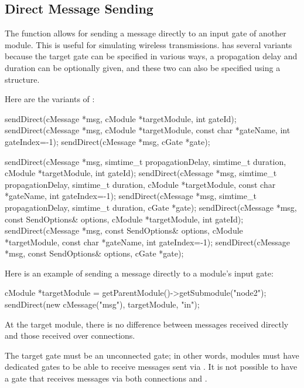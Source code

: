 \subsection{Direct Message Sending}
\label{sec:simple-modules:direct-sending}

The  function allows for sending a message directly to an
input gate of another module. This is useful for simulating wireless
transmissions.  has several variants because the target gate
can be specified in various ways, a propagation delay and duration can be
optionally given, and these two can also be specified using a
 structure.

Here are the variants of :

\begin{cpp}
sendDirect(cMessage *msg, cModule *targetModule, int gateId);
sendDirect(cMessage *msg, cModule *targetModule, const char *gateName,
               int gateIndex=-1);
sendDirect(cMessage *msg, cGate *gate);

sendDirect(cMessage *msg, simtime_t propagationDelay, simtime_t duration,
               cModule *targetModule, int gateId);
sendDirect(cMessage *msg, simtime_t propagationDelay, simtime_t duration,
               cModule *targetModule, const char *gateName, int gateIndex=-1);
sendDirect(cMessage *msg, simtime_t propagationDelay, simtime_t duration,
               cGate *gate);
sendDirect(cMessage *msg, const SendOptions& options, cModule *targetModule,
               int gateId);
sendDirect(cMessage *msg, const SendOptions& options, cModule *targetModule,
               const char *gateName, int gateIndex=-1);
sendDirect(cMessage *msg, const SendOptions& options, cGate *gate);
\end{cpp}

Here is an example of sending a message directly to a module's input gate:

\begin{cpp}
cModule *targetModule = getParentModule()->getSubmodule("node2");
sendDirect(new cMessage("msg"), targetModule, "in");
\end{cpp}

At the target module, there is no difference between messages received
directly and those received over connections.

The target gate must be an unconnected gate; in other words, modules must
have dedicated gates to be able to receive messages sent via .
It is not possible to have a gate that receives messages via both connections
and .

